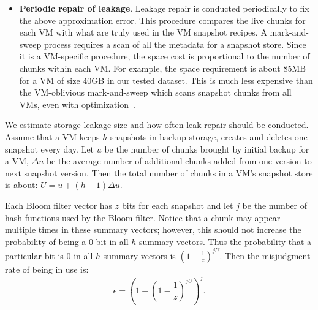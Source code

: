 \begin{itemize}
\item {\bf Periodic repair of leakage}.
Leakage repair is conducted periodically to fix the above approximation error.
This procedure compares the live chunks for each VM with what are truly used in the VM snapshot recipes.
A mark-and-sweep process  requires a scan of all the metadata for a snapshot store.
Since it is a VM-specific procedure, 
the space cost is proportional to the number of chunks
within each VM. For example, the space requirement is about 85MB for a VM of size 40GB in our tested dataset.
 This is  much less expensive  than  the VM-oblivious mark-and-sweep
which scans snapshot chunks from all VMs, even with optimization~\cite{Guo2011}.

\end{itemize}

We estimate storage leakage size and how often leak repair should be conducted.
Assume that  a VM keeps $h$ snapshots in backup storage, creates and deletes one snapshot
every day. Let $u$ be the number of chunks brought by initial backup for a VM, $\Delta u$ be the average
number of additional chunks added from one version to next snapshot version. Then the total number of 
chunks in a VM's snapshot store is about:
$
U = u + (h-1)\Delta u.
$

Each Bloom filter vector has  $z$ bits for each snapshot and let $j$ be the number of hash functions used by the
Bloom filter.  Notice that a chunk may appear multiple times in these summary vectors; however, this should not 
increase the probability of being a 0 bit in all $h$ summary vectors.
Thus the probability that a particular bit is 0  in all $h$ summary vectors is  
$(1- \frac{1}{z}) ^{j U}$. 
Then the misjudgment rate of being in use  is: 
\begin{equation}
\label{eq:falserate}
\epsilon = (1-(1-\frac{1}{z})^{jU})^j.
\end{equation}


